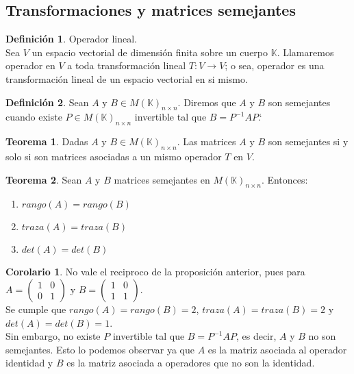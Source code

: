 \documentclass[10pt]{article}
\theoremstyle{definition}
\newtheorem{definition}{Definición}[section]
\newtheorem{theorem}{Teorema}[section]
\newtheorem{corollary}{Corolario}[theorem]
\begin{document}
\subsection{Transformaciones y matrices semejantes}
\begin{definition}{Operador lineal.}
	\\Sea $V$ un espacio vectorial de dimensión finita sobre un cuerpo $\mathbb{K}$. Llamaremos operador en $V$ a toda transformación lineal $T:V\rightarrow V$; o sea, operador es una transformación lineal de un espacio vectorial en si mismo.
\end{definition}
\begin{definition}
	Sean $A$ y $B\in M(\mathbb{K})_{n\times n}$. Diremos que $A$ y $B$ son semejantes cuando existe $P \in M(\mathbb{K})_{n\times n}$ invertible tal que $B=P^{-1}AP$.`
\end{definition}
\begin{theorem}
	Dadas $A$ y $B\in M(\mathbb{K})_{n\times n}$. Las matrices $A$ y $B$ son semejantes si y solo si son matrices asociadas a un mismo operador $T$ en $V$.
\end{theorem}
\begin{theorem}
	Sean $A$ y $B$ matrices semejantes en $M(\mathbb{K})_{n\times n}$. Entonces:
	\begin{enumerate}
		\item $rango(A)=rango(B)$
		\item $traza(A)=traza(B)$
		\item $det(A)=det(B)$
	\end{enumerate}
\end{theorem}
\begin{corollary}
	No vale el reciproco de la proposición anterior, pues para $A=\begin{pmatrix} 1 & 0 \\ 0 & 1 \end{pmatrix}$ y $B=\begin{pmatrix} 1 & 0 \\ 1 & 1 \end{pmatrix}$.\\
	Se cumple que $rango(A)=rango(B)=2$, $traza(A)=traza(B)=2$ y $det(A)=det(B)=1$.\\
	Sin embargo, no existe $P$ invertible tal que $B=P^{-1}AP$, es decir, $A$ y $B$ no son semejantes. Esto lo podemos observar ya que $A$ es la matriz asociada al operador identidad y $B$ es la matriz asociada a operadores que no son la identidad.
\end{corollary}
\end{document}
